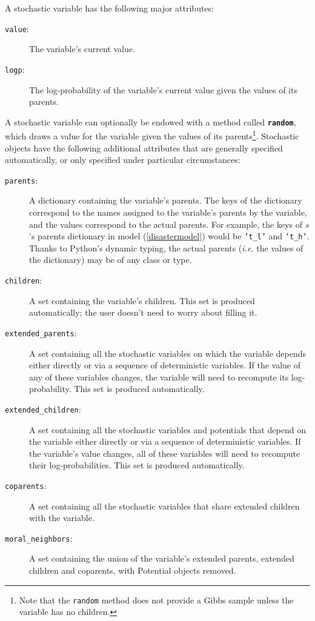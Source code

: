 A stochastic variable has the following major attributes: 
\begin{description}
    \item[\texttt{value}:] The variable's current value.
    \item[\texttt{logp}:] The log-probability of the variable's current value given the values of its parents.
\end{description}
A stochastic variable can optionally be endowed with a method called \texttt{\bfseries random}, which draws a value for the variable given the values of its parents\footnote{Note that the \texttt{random} method does not provide a Gibbs sample unless the variable has no children.}. Stochastic objects have the following additional attributes that are generally specified automatically, or only specified under particular circumstances:
\begin{description}
    \item[\texttt{parents}:] A dictionary containing the variable's parents. The keys of the dictionary correspond to the names assigned to the variable's parents by the variable, and the values correspond to the actual parents. For example, the keys of $s$'s parents dictionary in model (\ref{disastermodel}) would be \texttt{'t_l'} and \texttt{'t_h'}. Thanks to Python's dynamic typing, the actual parents (\emph{i.e.} the values of the dictionary) may be of any class or type.
    \item[\texttt{children}:] A set containing the variable's children. This set is produced automatically; the user doesn't need to worry about filling it.
    \item[\texttt{extended_parents}:] A set containing all the stochastic variables on which the variable depends either directly or via a sequence of deterministic variables. If the value of any of these variables changes, the variable will need to recompute its log-probability. This set is produced automatically.
    \item[\texttt{extended_children}:] A set containing all the stochastic variables and potentials that depend on the variable either directly or via a sequence of deterministic variables. If the variable's value changes, all of these variables will need to recompute their log-probabilities. This set is produced automatically.
    \item[\texttt{coparents}:] A set containing all the stochastic variables that share extended children with the variable.
    \item[\texttt{moral_neighbors}:] A set containing the union of the variable's extended parents, extended children and coparents, with Potential objects removed.

\end{description}
